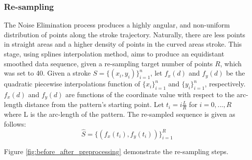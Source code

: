 \documentclass[10pt, conference, compsocconf]{IEEEtran}
\theoremstyle{definition}
\begin{document}
\subsubsection{Re-sampling}
The Noise Elimination process produces a highly angular, and non-uniform distribution of points along the stroke trajectory.
Naturally, there are less points in straight areas and a higher density of points in the curved areas stroke. 
This stage, using splines interpolation method, aims to produce an equidistant smoothed data sequence, given a re-sampling target number of points $R$, which was set to 40. 
Given a stroke $S=\{(x_i,y_i)\}_{i=1}^{n}$, let $f_{x}(d)$ and $f_{y}(d)$ be the quadratic piecewise interpolations function of $\{x_i\}_{i=1}^{n}$ and $\{y_i\}_{i=1}^{n}$, respectively. 
$f_{x}(d)$ and $f_{y}(d)$ are functions of the coordinate value with respect to the arc-length distance from the pattern's starting point. 
Let $t_i=i\frac{L}{R}$ for $i=0,...,R$ where L is the arc-length of the pattern.
The re-sampled sequence is given as follows:
\begin{equation}
\widehat{S}=\{(f_x(t_i),f_y(t_i))\}_{i=1}^{R}
\end{equation}

Figure \ref{fig:before_after_preprocessing} demonstrate the re-sampling steps.
\end{document}
